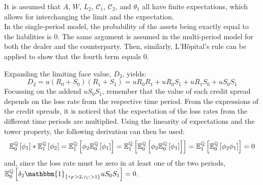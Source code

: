 \documentclass[main.tex]{subfiles}
\begin{document}
        It is assumed that $A$, $W$, $L_{2}$, $\mathcal{C}_1$, $\mathcal{C}_2$, and $\theta_1$ all have finite expectations,
        which allows for interchanging the limit and the expectation.
        \\
        In the single-period model, the probability of the assets being exactly equal to the liabilities is 0.
        The same argument is assumed in the multi-period model for both the dealer and the counterparty.
        Then, similarly, 
        L'H\^{o}pital's %
        rule can be applied to show that the fourth term equals 0.
        
        Expanding the limiting face value, $D_{2}$, yields:
        \begin{equation}
            D_2 = u(R_0 + S_0)(R_1 + S_1) = u R_0 R_1 + u R_0 S_1 + u R_1 S_0 + u S_0 S_1
        \end{equation}
        Focussing on the addend $u S_0 S_1$, remember that the value of each credit spread depends on the loss rate from the respective time period.
        From the expressions of the credit spreads, it is noticed that the expectation of the loss rates from the different time periods are multiplied.
        Using the linearity of expectations and the tower property, the following derivation can then be used:
        \begin{equation*}
            \mathbb{E}_{0}^{\mathbb{Q}}\left[\phi_1\right]
            * \mathbb{E}_{1}^{\mathbb{Q}}\left[\phi_2\right]
            = \mathbb{E}_{1}^{\mathbb{Q}}\left[
                \phi_2 \mathbb{E}_{0}^{\mathbb{Q}}\left[\phi_1\right]
            \right] 
            = \mathbb{E}_{1}^{\mathbb{Q}}\left[
                \mathbb{E}_{0}^{\mathbb{Q}}\left[
                    \phi_2
                    \mathbb{E}_{0}^{\mathbb{Q}}\left[
                        \phi_1
                    \right]
                \right]
            \right]
            = \mathbb{E}_{1}^{\mathbb{Q}}\left[
                \mathbb{E}_{0}^{\mathbb{Q}}\left[
                    \phi_2 \phi_1
                \right]
            \right]
            = 0
        \end{equation*}
        and, since the loss rate must be zero in at least one of the two periods,
        $\mathbb{E}_{0}^{\rnmeasure}\left[\delta_2\mathbbm{1}_{\{\tau_{F}>2,\tau_{C}>1\}}u S_0 S_1\right] = 0$.
        
\end{document}
